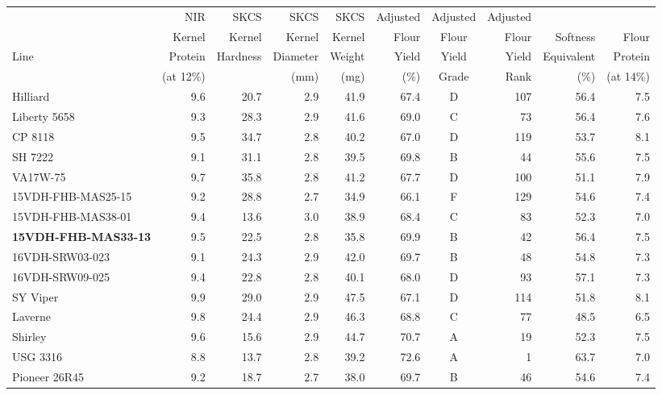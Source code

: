 \documentclass[12pt, letterpaper]{article}
\begin{document}
\begin{landscape}
\begin{table}[ht]
\begin{tabular}{lrrrrrcrrr}
  \hline
     & NIR       & SKCS     & SKCS     & SKCS   & Adjusted & Adjusted & Adjusted &            &           \\ 
     & Kernel    & Kernel   & Kernel   & Kernel & Flour    & Flour    & Flour    & Softness   & Flour     \\ 
Line & Protein   & Hardness & Diameter & Weight & Yield    & Yield    & Yield    & Equivalent & Protein   \\ 
     & (at 12\%) &          & (mm)     & (mg)   & (\%)     &  Grade   & Rank     & (\%)       & (at 14\%) \\ 
  \hline
  Hilliard           & 9.6 & 20.7 & 2.9 & 41.9 & 67.4 & D & 107 & 56.4 & 7.5 \\ 
  Liberty 5658       & 9.3 & 28.3 & 2.9 & 41.6 & 69.0 & C & 73  & 56.4 & 7.6 \\ 
  CP 8118            & 9.5 & 34.7 & 2.8 & 40.2 & 67.0 & D & 119 & 53.7 & 8.1 \\ 
  SH 7222            & 9.1 & 31.1 & 2.8 & 39.5 & 69.8 & B & 44  & 55.6 & 7.5 \\ 
  VA17W-75           & 9.7 & 35.8 & 2.8 & 41.2 & 67.7 & D & 100 & 51.1 & 7.9 \\ 
  15VDH-FHB-MAS25-15 & 9.2 & 28.8 & 2.7 & 34.9 & 66.1 & F & 129 & 54.6 & 7.4 \\ 
  15VDH-FHB-MAS38-01 & 9.4 & 13.6 & 3.0 & 38.9 & 68.4 & C & 83  & 52.3 & 7.0 \\ 
  \textbf{15VDH-FHB-MAS33-13} & 9.5 & 22.5 & 2.8 & 35.8 & 69.9 & B & 42  & 56.4 & 7.5 \\ 
  16VDH-SRW03-023    & 9.1 & 24.3 & 2.9 & 42.0 & 69.7 & B & 48  & 54.8 & 7.3 \\ 
  16VDH-SRW09-025    & 9.4 & 22.8 & 2.8 & 40.1 & 68.0 & D & 93  & 57.1 & 7.3 \\ 
  SY Viper           & 9.9 & 29.0 & 2.9 & 47.5 & 67.1 & D & 114 & 51.8 & 8.1 \\ 
  Laverne            & 9.8 & 24.4 & 2.9 & 46.3 & 68.8 & C & 77  & 48.5 & 6.5 \\ 
  Shirley            & 9.6 & 15.6 & 2.9 & 44.7 & 70.7 & A & 19  & 52.3 & 7.5 \\ 
  USG 3316           & 8.8 & 13.7 & 2.8 & 39.2 & 72.6 & A & 1   & 63.7 & 7.0 \\ 
  Pioneer 26R45      & 9.2 & 18.7 & 2.7 & 38.0 & 69.7 & B & 46  & 54.6 & 7.4 \\ 
   \hline
\end{tabular}


\end{table}
\end{landscape}
\end{document}
